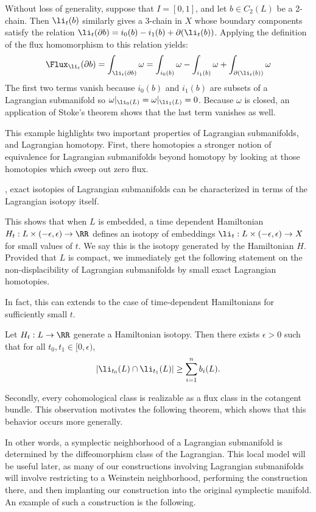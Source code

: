 Without loss of generality, suppose that $I=[0,1]$, and let $b\in C_2(L)$ be a 2-chain.
Then $\li_t(b)$ similarly gives a 3-chain in $X$ whose boundary components satisfy the relation $\li_t(\partial b)=i_0(b)-i_1(b)+\partial(\li_t(b))$. 
Applying the definition of the flux homomorphism to this relation yields:
\[
    \Flux_{\li_t}(\partial b)=\int_{\li_t(\partial b)}\omega=\int_{i_0(b)}\omega-\int_{i_1(b)}\omega + \int_{\partial(\li_t(b))}\omega\]
The first two terms vanish because $i_0(b)$ and $i_1(b)$ are subsets of a Lagrangian submanifold so $\omega|_{\li_0(L)}=\omega|_{\li_1(L)}=0$.
Because $\omega$ is closed, an application of Stoke's theorem shows that the last term vanishes as well. 



This example highlights two important properties of Lagrangian submanifolds, and Lagrangian homotopy. 
First, there homotopies a stronger notion of equivalence for Lagrangian submanifolds beyond homotopy by looking at those homotopies which sweep out zero flux. 

, exact isotopies of Lagrangian submanifolds can be characterized in terms of the Lagrangian isotopy itself. 


This shows that when $L$ is embedded, a time dependent Hamiltonian $H_t: L\times (-\epsilon, \epsilon)\to \RR$ defines an isotopy of embeddings $\li_t: L\times(-\epsilon, \epsilon)\to X$ for small values of $t$.
We say this is the isotopy generated by the Hamiltonian $H$.
Provided that $L$ is compact, we immediately get the following statement on the non-displacibility of Lagrangian submanifolds by small exact Lagrangian homotopies. 


In fact, this can extends to the case of time-dependent Hamiltonians for sufficiently small $t$. 
\begin{corollary}
    Let $H_t: L\to \RR$ generate a Hamiltonian isotopy. 
    Then there exists $\epsilon>0$ such that for all $t_0, t_1\in [0,\epsilon)$, 
    \[|\li_{t_0}(L)\cap \li_{t_1}(L)|\geq \sum_{i=1}^n b_i(L).\]
\end{corollary}
Secondly, every cohomological class is realizable as a flux class in the cotangent bundle. 
This observation motivates the following theorem, which shows that this behavior occurs more generally.

In other words,  a symplectic neighborhood of a Lagrangian submanifold is determined by the diffeomorphism class of the Lagrangian. 
This local model will be useful later, as many of our constructions involving Lagrangian submanifolds will involve restricting to a Weinstein neighborhood, performing the construction there, and then implanting our construction into the original symplectic manifold.
An example of such a construction is the following.


